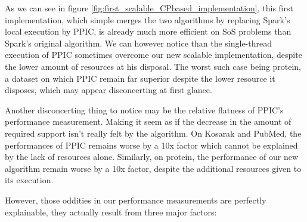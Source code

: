 \documentclass{eplmastersthesis}
\begin{document}
As we can see in figure \ref{fig:first_scalable_CPbased_implementation}, this first implementation, which simple merges the two algorithms by replacing Spark's local execution by PPIC, is already much more efficient on \acrlong{SoS} problems than Spark's original algorithm. We can however notice than the single-thread execution of PPIC sometimes overcome our new scalable implementation, despite the lower amount of resources at his disposal. The worst such case being protein, a dataset on which PPIC remain far superior despite the lower resource it disposes, which may appear disconcerting at first glance. \newline

Another disconcerting thing to notice may be the relative flatness of PPIC's performance measurement. Making it seem as if the decrease in the amount of required support isn't really felt by the algorithm. On Kosarak and PubMed, the performances of PPIC remains worse by a 10x factor which cannot be explained by the lack of resources alone. Similarly, on protein, the performance of our new algorithm remain worse by a 10x factor, despite the additional resources given to its execution. \newline

However, those oddities in our performance measurements are perfectly explainable, they actually result from three major factors:
\end{document}
